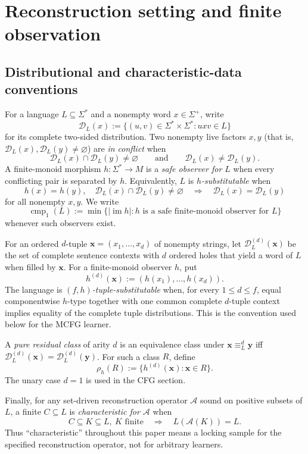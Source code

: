 \documentclass[11pt]{article}
\newcommand{\D}{\mathcal D}
\newcommand{\im}{\operatorname{im}}
\newcommand{\cmp}{\operatorname{cmp}}
\begin{document}
\section{Reconstruction setting and finite observation}

\subsection{Distributional and characteristic-data conventions}

For a language $L\subseteq\Sigma^*$ and a nonempty word $x\in\Sigma^+$, write
\[
  \D_L(x):=\{(u,v)\in\Sigma^*\times\Sigma^*:uxv\in L\}
\]
for its complete two-sided distribution.  Two nonempty live factors $x,y$ (that is,
$\D_L(x),\D_L(y)\ne\varnothing$) are
\emph{in conflict} when
\[
  \D_L(x)\cap\D_L(y)\ne\varnothing
  \qquad\text{and}\qquad
  \D_L(x)\ne\D_L(y).
\]
A finite-monoid morphism $h:\Sigma^*\to M$ is a \emph{safe observer for $L$}
when every conflicting pair is separated by $h$.  Equivalently, $L$ is
\emph{$h$-substitutable} when
\[
  h(x)=h(y),\quad
  \D_L(x)\cap\D_L(y)\ne\varnothing
  \quad\Longrightarrow\quad
  \D_L(x)=\D_L(y)
\]
for all nonempty $x,y$.  We write
\[
  \cmp_1(L):=
  \min\{|\im h|:h\text{ is a safe finite-monoid observer for }L\}
\]
whenever such observers exist.

For an ordered $d$-tuple $\mathbf x=(x_1,\ldots,x_d)$ of nonempty strings,
let $\D_L^{(d)}(\mathbf x)$ be the set of complete sentence contexts with
$d$ ordered holes that yield a word of $L$ when filled by $\mathbf x$.
For a finite-monoid observer $h$, put
\[
  h^{(d)}(\mathbf x):=(h(x_1),\ldots,h(x_d)).
\]
The language is \emph{$(f,h)$-tuple-substitutable} when, for every
$1\le d\le f$, equal componentwise $h$-type together with one common complete
$d$-tuple context implies equality of the complete tuple distributions.  This
is the convention used below for the MCFG learner.

A \emph{pure residual class} of arity $d$ is an equivalence class under
$\mathbf x\equiv_L^d\mathbf y$ iff
$\D_L^{(d)}(\mathbf x)=\D_L^{(d)}(\mathbf y)$.  For such a class $R$, define
\[
  \rho_h(R):=\{h^{(d)}(\mathbf x):\mathbf x\in R\}.
\]
The unary case $d=1$ is used in the CFG section.

Finally, for any set-driven reconstruction operator $\mathcal A$ sound on
positive subsets of $L$, a finite $C\subseteq L$ is \emph{characteristic for
$\mathcal A$} when
\[
  C\subseteq K\subseteq L,\ K\text{ finite}
  \quad\Longrightarrow\quad
  L(\mathcal A(K))=L.
\]
Thus ``characteristic'' throughout this paper means a locking sample for the
specified reconstruction operator, not for arbitrary learners.
\end{document}
